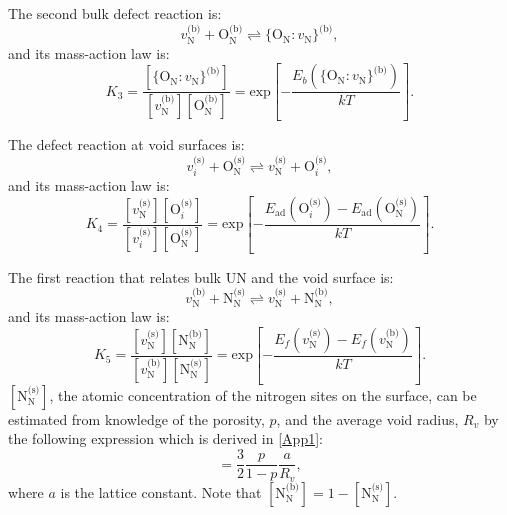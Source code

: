 \documentclass[preprint,12pt,sort&compress]{elsarticle}
\newcommand{\?}{\stackrel{?}{=}}
\begin{document}
The second bulk defect reaction is:
\begin{equation}
v_\text{N}^\text{(b)} + \text{O}_\text{N}^\text{(b)} \rightleftharpoons \{\text{O}_\text{N} \! : \! v_\text{N}\}^\text{(b)},
\end{equation}
and its mass-action law is:
\begin{equation}
K_3 = \frac{ [ \{\text{O}_\text{N} \! : \! v_\text{N}\}^\text{(b)} ] } { [ v_\text{N}^\text{(b)} ] [ \text{O}_\text{N}^\text{(b)} ] } = \text{exp}\! \left[ - \frac{ E_b( \{\text{O}_\text{N} \! : \! v_\text{N}\}^\text{(b)} ) } { k T } \right].
\end{equation}

The defect reaction at void surfaces is:
\begin{equation}
v_i^\text{(s)} + \text{O}_\text{N}^\text{(s)}  \rightleftharpoons  v_\text{N}^\text{(s)} + \text{O}_i^\text{(s)},
\end{equation}
and its mass-action law is:
\begin{equation}
K_4 = \frac{ [ v_\text{N}^\text{(s)} ]  [ \text{O}_i^\text{(s)} ] } { [ v_i^\text{(s)} ] [ \text{O}_\text{N}^\text{(s)} ] } = \text{exp}\! \left[ - \frac{ E_\text{ad}( \text{O}_i^\text{(s)} ) - E_\text{ad}( \text{O}_\text{N}^\text{(s)} ) } { k T } \right].
\end{equation}

The first reaction that relates bulk UN and the void surface is:
\begin{equation}
v_\text{N}^\text{(b)} + \text{N}_\text{N}^\text{(s)}  \rightleftharpoons v_\text{N}^\text{(s)} + \text{N}_\text{N}^\text{(b)},
\end{equation}
and its mass-action law is:
\begin{equation}
K_5 = \frac{ [ v_\text{N}^\text{(s)} ]  [ \text{N}_\text{N}^\text{(b)} ] } { [ v_\text{N}^\text{(b)} ] [ 
\text{N}_\text{N}^\text{(s)} ] } = \text{exp}\! \left[ - \frac{ E_f ( v_\text{N}^\text{(s)} ) - E_f ( v_\text{N}^\text{(b)} ) } { k T } \right].
\label{Eq:VN-VNs}
\end{equation}
$[ \text{N}_\text{N}^\text{(s)} ]$, the atomic concentration of the nitrogen sites on the surface, can be estimated from knowledge of the porosity, $p$, and the average void radius, $R_v$ by the following expression which is derived in \ref{App1}:
\begin{equation}
[ \text{N}_\text{N}^\text{(s)} ] = \frac{3}{2} \frac{p}{1-p} \frac{a}{R_v},
\label{Eq:NNs1}
\end{equation}
where $a$ is the lattice constant. Note that $[ \text{N}_\text{N}^\text{(b)} ] = 1 - [ \text{N}_\text{N}^\text{(s)} ]$. 
\end{document}
